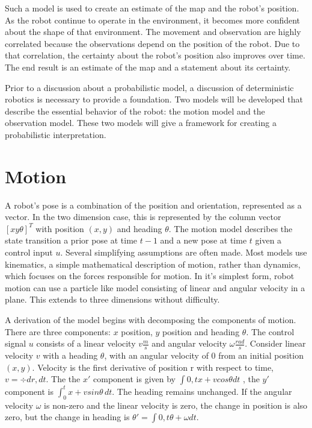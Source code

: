 \documentclass[12pt]{report}
\begin{document}
Such a model is used to create an estimate of the map and the robot's position.  As the robot continue to operate in the environment, it becomes more confident about the shape of that environment.  The movement and observation are highly correlated because the observations depend on the position of the robot.  Due to that correlation, the certainty about the robot's position also improves over time.  The end result is an estimate of the map and a statement about its certainty.

Prior to a discussion about a probabilistic model, a discussion of deterministic robotics is necessary to provide a foundation.  Two models will be developed that describe the essential behavior of the robot: the motion model and the observation model.  These two models will give a framework for creating a probabilistic interpretation. 

\section{Motion}
A robot's pose is a combination of the position and orientation, represented as a vector.  In the two dimension case, this is represented by the column vector $[x y \theta]^T$ with position $(x,y)$ and heading $\theta$.  The motion model describes the state transition a prior pose at time $t-1$ and a new pose at time $t$ given a control input $u$.  Several simplifying assumptions are often made.  Most models use kinematics, a simple mathematical description of motion, rather than dynamics, which focuses on the forces responsible for motion.  In it's simplest form, robot motion can use a particle like model consisting of linear and angular velocity in a plane.  This extends to three dimensions without difficulty.   

A derivation of the model begins with decomposing the components of motion.  There are three components: $x$ position, $y$ position and heading $\theta$.  The control signal $u$ consists of a linear velocity $v \frac{m}{s}$ and angular velocity $\omega \frac{rad}{s}$.  Consider linear velocity $v$ with a heading $\theta$, with an angular velocity of $0$ from an initial position $(x,y)$.  Velocity is the first derivative of position r with respect to time, $v = \div{dr, dt}$.  The the $x'$ component is given by $\int{0,t} x + v cos \theta dt$ , the $y'$ component is $\int_0^t \! x + v sin \theta \, dt$.  The heading remains unchanged.  If the angular velocity $\omega$ is non-zero and the linear velocity is zero, the change in position is also zero, but the change in heading is $\theta' = \int{0,t} \theta + \omega dt$.
\end{document}
